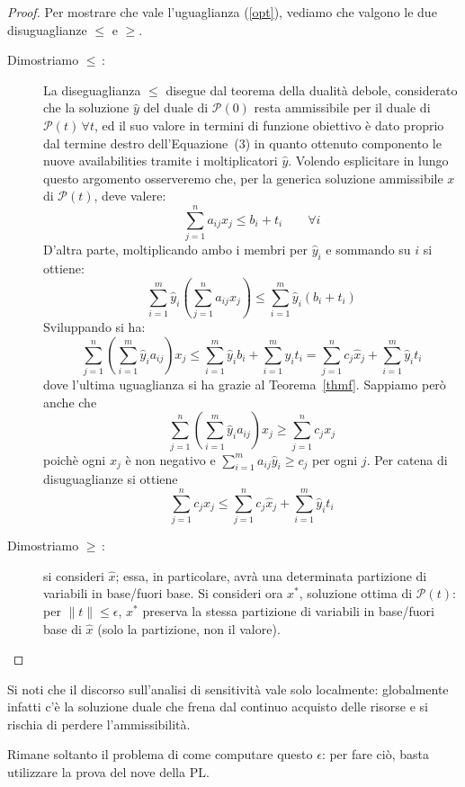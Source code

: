 \documentclass{article}[10pt]
\theoremstyle{theorem}
\theoremstyle{definition}
\theoremstyle{definition}
\theoremstyle{definition}
\begin{document}
	\begin{proof}
		Per mostrare che vale l'uguaglianza (\ref{opt}), vediamo che valgono le due disuguaglianze $\leq$ e $\geq$.
		\begin{description}
		\item[Dimostriamo $\leq$\,:]
                  La diseguaglianza $\leq$ disegue dal teorema della dualit\`a debole, considerato che la soluzione $\hat{y}$ del duale di $\mathcal{P}(0)$ resta ammissibile
                  per il duale di $\mathcal{P}(t)\, \forall t$, ed il suo valore in termini di funzione obiettivo è dato proprio dal termine destro dell'Equazione~(3) in quanto ottenuto componento le nuove availabilities tramite i moltiplicatori $\hat{y}$.
                  Volendo esplicitare in lungo questo argomento osserveremo che,
                  per la generica soluzione ammissibile $x$ di $\mathcal{P}(t)$, deve valere:
			\begin{equation*}
			\sum_{j=1}^{n}a_{ij}x_j \leq b_i + t_i \qquad \forall i
			\end{equation*}
			D'altra parte, moltiplicando ambo i membri per $\hat{y}_i$ e sommando su $i$ si ottiene:
			\begin{equation*}
			\sum_{i=1}^{m}\hat{y}_i\left(\sum_{j=1}^{n}a_{ij}x_j\right) \leq \sum_{i=1}^{m}\hat{y}_i\left(b_i + t_i\right)
			\end{equation*}
			Sviluppando si ha:
			\begin{equation*}
			\sum_{j=1}^{n}\left(\sum_{i=1}^{m}\hat{y}_ia_{ij}\right)x_j  \leq  \sum_{i=1}^{m}\hat{y}_ib_i + \sum_{i=1}^{m}\hat{y}_it_i = \sum_{j=1}^{n}c_j\hat{x}_j + \sum_{i=1}^{m}\hat{y}_it_i
			\end{equation*}
			dove l'ultima uguaglianza si ha grazie al Teorema~\ref{thmf}. Sappiamo però anche che
			\begin{equation*}
			\sum_{j=1}^{n}\left(\sum_{i=1}^{m}\hat{y}_ia_{ij}\right)x_j \geq \sum_{j=1}^{n}c_jx_j
			\end{equation*}
			poichè ogni $x_j$ è non negativo e $\sum_{i=1}^{m}a_{ij}\hat{y}_i \geq c_j$ per ogni $j$. Per catena di disuguaglianze si ottiene
			\begin{equation*}
			\sum_{j=1}^{n}c_jx_j \leq \sum_{j=1}^{n}c_j\hat{x}_j + \sum_{i=1}^{m}\hat{y}_it_i
			\end{equation*}
		\item [Dimostriamo $\geq$\,:] si consideri $\hat{x}$; essa, in particolare, avrà una determinata partizione di variabili in base/fuori base. Si consideri ora $x^*$, soluzione ottima di $\mathcal{P}(t)$: per $\lVert t\rVert\leq \epsilon$, $x^*$ preserva la stessa partizione di variabili in base/fuori base di $\hat{x}$ (solo la partizione, non il valore). 
		\end{description}
	\end{proof}
	Si noti che il discorso sull'analisi di sensitività vale solo localmente: globalmente infatti c'è la soluzione duale che frena dal continuo acquisto delle risorse e si rischia di perdere l'ammissibilità.
	
	Rimane soltanto il problema di come computare questo $\epsilon$: per fare ciò, basta utilizzare la prova del nove della PL.
\end{document}
